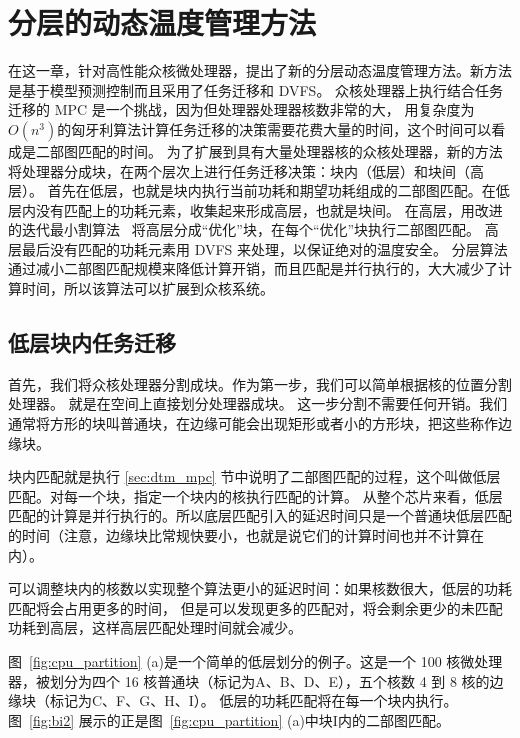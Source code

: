 
\chapter{分层的动态温度管理方法}\label{sec:new_method}

在这一章，针对高性能众核微处理器，提出了新的分层动态温度管理方法。新方法是基于模型预测控制而且采用了任务迁移和 DVFS。
众核处理器上执行结合任务迁移的 MPC 是一个挑战，因为但处理器处理器核数非常的大，
用复杂度为$O(n^{3})$的匈牙利算法计算任务迁移的决策需要花费大量的时间，这个时间可以看成是二部图匹配的时间。
为了扩展到具有大量处理器核的众核处理器，新的方法将处理器分成块，在两个层次上进行任务迁移决策：块内（低层）和块间（高层）。
首先在低层，也就是块内执行当前功耗和期望功耗组成的二部图匹配。在低层内没有匹配上的功耗元素，收集起来形成高层，也就是块间。
在高层，用改进的迭代最小割算法~  将高层分成“优化”块，在每个“优化”块执行二部图匹配。
高层最后没有匹配的功耗元素用 DVFS 来处理，以保证绝对的温度安全。
分层算法通过减小二部图匹配规模来降低计算开销，而且匹配是并行执行的，大大减少了计算时间，所以该算法可以扩展到众核系统。

\section{低层块内任务迁移}\label{sec:parts}

首先，我们将众核处理器分割成块。作为第一步，我们可以简单根据核的位置分割处理器。
就是在空间上直接划分处理器成块。
这一步分割不需要任何开销。我们通常将方形的块叫普通块，在边缘可能会出现矩形或者小的方形块，把这些称作边缘块。

块内匹配就是执行 \ref{sec:dtm_mpc} 节中说明了二部图匹配的过程，这个叫做低层匹配。对每一个块，指定一个块内的核执行匹配的计算。
从整个芯片来看，低层匹配的计算是并行执行的。所以底层匹配引入的延迟时间只是一个普通块低层匹配的时间（注意，边缘块比常规快要小，也就是说它们的计算时间也并不计算在内）。

可以调整块内的核数以实现整个算法更小的延迟时间：如果核数很大，低层的功耗匹配将会占用更多的时间，
但是可以发现更多的匹配对，将会剩余更少的未匹配功耗到高层，这样高层匹配处理时间就会减少。

图~\ref{fig:cpu_partition} (a)是一个简单的低层划分的例子。这是一个 100 核微处理器，被划分为四个 16 核普通块（标记为A、B、D、E），五个核数 4 到 8 核的边缘块（标记为C、F、G、H、I）。
低层的功耗匹配将在每一个块内执行。图~\ref{fig:bi2} 展示的正是图~\ref{fig:cpu_partition} (a)中块I内的二部图匹配。

